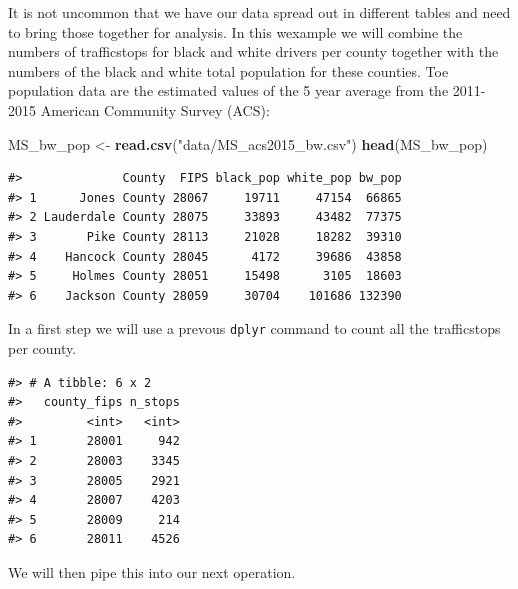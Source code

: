 \documentclass[]{book}
\newenvironment{Shaded}{\begin{snugshade}}{\end{snugshade}}
\newcommand{\DataTypeTok}[1]{\textcolor[rgb]{0.13,0.29,0.53}{#1}}
\newcommand{\KeywordTok}[1]{\textcolor[rgb]{0.13,0.29,0.53}{\textbf{#1}}}
\newcommand{\NormalTok}[1]{#1}
\newcommand{\OperatorTok}[1]{\textcolor[rgb]{0.81,0.36,0.00}{\textbf{#1}}}
\newcommand{\StringTok}[1]{\textcolor[rgb]{0.31,0.60,0.02}{#1}}
\begin{document}
It is not uncommon that we have our data spread out in different tables and need to bring those together for analysis. In this wexample we will combine the numbers of trafficstops for black and white drivers per county together with the numbers of the black and white total population for these counties. Toe population data are the estimated values of the 5 year average from the 2011-2015 American Community Survey (ACS):

\begin{Shaded}
\begin{Highlighting}[]
\NormalTok{MS_bw_pop <-}\StringTok{ }\KeywordTok{read.csv}\NormalTok{(}\StringTok{"data/MS_acs2015_bw.csv"}\NormalTok{)}
\KeywordTok{head}\NormalTok{(MS_bw_pop)}
\end{Highlighting}
\end{Shaded}

\begin{verbatim}
#>              County  FIPS black_pop white_pop bw_pop
#> 1      Jones County 28067     19711     47154  66865
#> 2 Lauderdale County 28075     33893     43482  77375
#> 3       Pike County 28113     21028     18282  39310
#> 4    Hancock County 28045      4172     39686  43858
#> 5     Holmes County 28051     15498      3105  18603
#> 6    Jackson County 28059     30704    101686 132390
\end{verbatim}

In a first step we will use a prevous \texttt{dplyr} command to count all the trafficstops per county.

\begin{Shaded}
\end{Shaded}

\begin{verbatim}
#> # A tibble: 6 x 2
#>   county_fips n_stops
#>         <int>   <int>
#> 1       28001     942
#> 2       28003    3345
#> 3       28005    2921
#> 4       28007    4203
#> 5       28009     214
#> 6       28011    4526
\end{verbatim}

We will then pipe this into our next operation.
\end{document}
